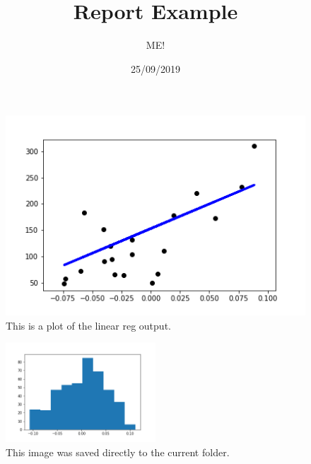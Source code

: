 \documentclass{article}%
\title{Report Example}%
\author{ME!}%
\date{25/09/2019}%
\begin{document}
%
\normalsize%
\maketitle%
%
\newline%
\linebreak%
%
\newline%
\linebreak%
%
\newline%
\linebreak%
%
\newline%
\linebreak%
%
\newline%
\linebreak%


\begin{figure}[!ht]%
\centering%
\includegraphics[scale=0.6]{../figures/Figure1.png}%
\linebreak%
\caption{This is a plot of the linear reg output.}%
\end{figure}

%
\newline%
\linebreak%


\begin{figure}[!ht]%
\centering%
\includegraphics[width=0.5\textwidth]{../figures/Figure2.png}%
\linebreak%
\caption{This image was saved directly to the current folder.}%
\end{figure}

%
\newline%
\linebreak%
%
\newline%
\linebreak%
%
\newline%
\linebreak%
%
\newline%
\linebreak%
\clearpage%
\end{document}
